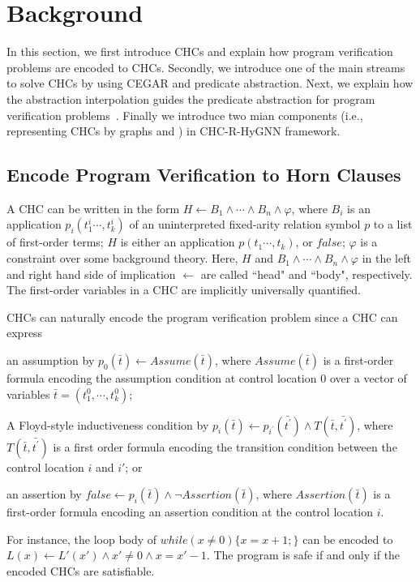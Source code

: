 

\section{Background}\label{section:background}
In this section, we first introduce CHCs and explain how program verification problems are encoded to CHCs.
%
Secondly, we introduce one of the main streams to solve CHCs by using CEGAR and predicate abstraction. 
%
Next, we explain how the abstraction interpolation guides the predicate abstraction for program verification problems~\cite{Leroux2016}.
%
Finally we introduce two mian components (i.e., representing CHCs by graphs and \hyperedgeGNN) in CHC-R-HyGNN framework.


\subsection{Encode Program Verification to Horn Clauses}
A CHC can be written in the form
$H \leftarrow B_{1}  \wedge \cdots \wedge B_{n} \wedge \varphi$,
where $B_{i}$ is an application $p_{i}(t_{1}^{i} \cdots, t_{k}^{i})$ of an uninterpreted fixed-arity relation symbol $p$ to a list of first-order terms;
 $H$ is either an application $p(t_{1} \cdots, t_{k})$, or $\mathit{false}$;
 $\varphi$ is a constraint over some background theory.
Here, $H$ and $B_{1} \wedge \cdots \wedge B_{n} \wedge \varphi$ in the left and right hand side of implication $\leftarrow$ are called ``head" and ``body", respectively.
%
The first-order variables in a CHC are implicitly universally quantified.


CHCs can naturally encode the program verification problem since a CHC can express 
\begin{inparaenum}[(i)]
  \item an assumption by $p_{0}(\bar{t})\leftarrow Assume(\bar{t})$, where $Assume(\bar{t})$ is a first-order formula encoding the assumption condition at control location $0$ over a vector of variables $\bar{t}=(t_{1}^{0},\cdots,t_{k}^{0})$;
  \item A Floyd-style inductiveness condition by $p_{i}(\bar{t}) \leftarrow p_{i^{'}}(\bar{t^{'}}) \wedge T(\bar{t},\bar{t^{'}})$, where $T(\bar{t},\bar{t^{'}})$ is a first order formula encoding the transition condition between the control location $i$ and $i'$; or
  \item an assertion by $\textit{false}\leftarrow p_{i}(\bar{t}) \wedge \neg Assertion(\bar{t})$,  where $Assertion(\bar{t})$ is a first-order formula encoding an assertion condition at the control location $i$.
\end{inparaenum}
For instance, the loop body of $while(x\neq 0)\{x=x+1;\}$ can be encoded to $L(x)\leftarrow L'(x') \wedge x'\neq 0 \wedge x=x'-1 $.
%
The program is safe if and only if the encoded CHCs are satisfiable.


